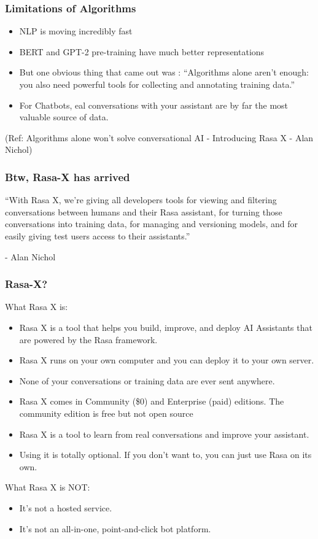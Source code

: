  \begin{frame}[fragile]\frametitle{Limitations of Algorithms}
\begin{itemize}
\item NLP is moving incredibly fast
\item BERT and GPT-2 pre-training have much better representations
\item But one obvious thing that came out was : ``Algorithms alone aren't enough: you also need powerful tools for collecting and annotating training data.''
\item For Chatbots, eal conversations with your assistant are by far the most valuable source of data.
\end{itemize}
{\tiny (Ref: Algorithms alone won’t solve conversational AI - Introducing Rasa X - Alan Nichol)}

\end{frame}

 \begin{frame}[fragile]\frametitle{Btw, Rasa-X has arrived}
``With Rasa X, we’re giving all developers tools for viewing and filtering conversations between humans and their Rasa assistant, for turning those conversations into training data, for managing and versioning models, and for easily giving test users access to their assistants.''

- Alan Nichol
\end{frame}

 \begin{frame}[fragile]\frametitle{Rasa-X?}
 What Rasa X is:
\begin{itemize}
\item Rasa X is a tool that helps you build, improve, and deploy AI Assistants that are powered by the Rasa framework. 
\item Rasa X runs on your own computer and you can deploy it to your own server. 
\item None of your conversations or training data are ever sent anywhere.
\item Rasa X comes in Community (\$0) and Enterprise (paid) editions. The community edition is free but not open source
\item Rasa X is a tool to learn from real conversations and improve your assistant.
\item Using it is totally optional. If you don’t want to, you can just use Rasa on its own.
\end{itemize}

 What Rasa X is NOT:
\begin{itemize}
\item It's not a hosted service.
\item It's not an all-in-one, point-and-click bot platform.
\end{itemize}
\end{frame}


